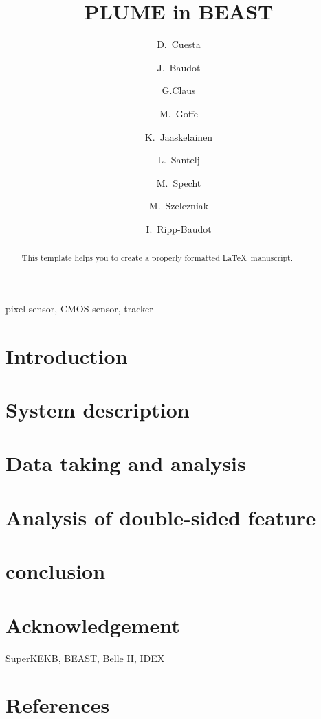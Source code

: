 \documentclass[review]{elsarticle}
\begin{document}
\begin{frontmatter}

\title{PLUME in BEAST}

\author[iphc]{D.~Cuesta}
\author[iphc]{J.~Baudot}
\author[iphc]{G.Claus}
\author[iphc]{M.~Goffe}
\author[iphc]{K.~Jaaskelainen}
\author[jsi]{L.~Santelj}
\author[iphc]{M.~Specht}
\author[iphc]{M.~Szelezniak}
\author[iphc]{I.~Ripp-Baudot}

\address[iphc]{Universit\'e de Strasbourg, CNRS, IPHC UMR 7178, F-67000 Strasbourg, France}
\address[jsi]{J. Stefan Institute, 1000 Ljubljana, Slovenia}



\begin{abstract}
This template helps you to create a properly formatted \LaTeX\ manuscript.
\end{abstract}

\begin{keyword}
pixel sensor, CMOS sensor, tracker
\end{keyword}

\end{frontmatter}

\linenumbers

\section{Introduction}
\label{sec:introduction}


\section{System description}
\label{sec:system}


\section{Data taking and analysis}
\label{sec:data}


\section{Analysis of double-sided feature}
\label{sec:doublesided}


\section{conclusion}
\label{sec:conclusion}


\section*{Acknowledgement}
SuperKEKB, BEAST, Belle II, IDEX

\section*{References}

\end{document}
